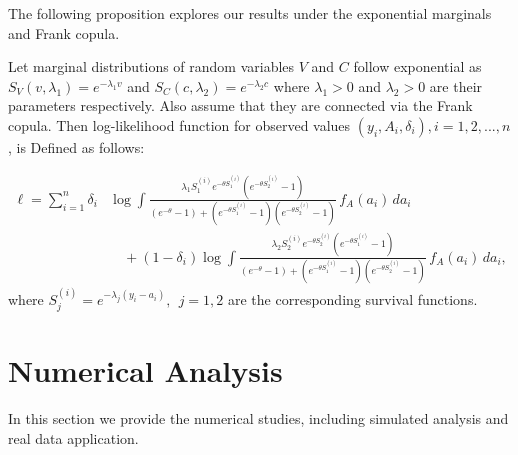 \documentclass[twoside]{article}
\begin{document}
The following proposition explores our results under the exponential marginals and Frank copula.
 \begin{pro}
\label{ex1}
Let  marginal  distributions of  random variables  $V$  and $C$ follow exponential  as $S_V(v, \lambda_1)=e^{-\lambda_1 v}$  and $S_C(c, \lambda_2)=e^{-\lambda_2 c}$ where $\lambda_1>0$ and $\lambda_2>0$ are their parameters respectively. Also assume that they are connected via the Frank copula. Then  log-likelihood  function for observed  values $(y_i,A_i,\delta_i), i=1,2,...,n$,  is 
Defined as follows:

$$
\begin{aligned}
\ell = \sum_{i=1}^{n} \delta_i &\log \int \frac{
\lambda_1 S_1^{(i)} e^{-\theta S_1^{(i)}} 
\left( e^{-\theta S_2^{(i)}} - 1 \right)
}{
(e^{-\theta} - 1) + 
\left( e^{-\theta S_1^{(i)}} - 1 \right)
\left( e^{-\theta S_2^{(i)}} - 1 \right)
} \, f_A(a_i) \, da_i \\
&\quad + (1 - \delta_i) \log \int \frac{
\lambda_2 S_2^{(i)} e^{-\theta S_2^{(i)}} 
\left( e^{-\theta S_1^{(i)}} - 1 \right)
}{
(e^{-\theta} - 1) + 
\left( e^{-\theta S_1^{(i)}} - 1 \right)
\left( e^{-\theta S_2^{(i)}} - 1 \right)
} \, f_A(a_i) \, da_i,
\end{aligned}
$$
 where  $S_j^{(i)} = e^{-\lambda_j (y_i - a_i)}, \ \ j = 1, 2$ are the corresponding  survival functions.

 \end{pro}
\section{Numerical Analysis}
In this section we provide the numerical studies, including simulated analysis and real data application.
\end{document}
